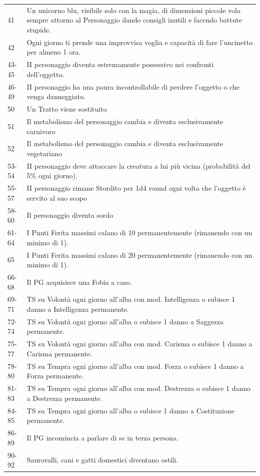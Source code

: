 \begin{tabularx}{0.98\textwidth}{lX}
41& Un unicorno blu, visibile solo con la magia, di dimensioni piccole vola sempre attorno al Personaggio dando consigli inutili e facendo battute stupide.\\
42& Ogni giorno ti prende una improvvisa voglia e capacità di fare l'uncinetto per almeno 1 ora.\\
43-45 & II personaggio diventa estremamente possessivo nei confronti dell'oggetto.\\
46-49 & II personaggio ha una paura incontrollabile di perdere l'oggetto o che venga danneggiato.\\
50& Un Tratto viene sostituito\\
51& Il metabolismo del personaggio cambia e diventa esclusivamente carnivoro\\
52& Il metabolismo del personaggio cambia e diventa esclusivamente vegetariano\\
53-54 & II personaggio deve attaccare la creatura a lui più vicina (probabilità del 5\% ogni giorno).\\
55-57 & II personaggio rimane Stordito per 1d4 round ogni volta che l'oggetto è servito al suo scopo\\
58-60 & Il personaggio diventa sordo\\
61-64 & I Punti Ferita massimi calano di 10 permanentemente (rimanendo con un minimo di 1).\\
65& I Punti Ferita massimi calano di 20 permanentemente (rimanendo con un minimo di 1).\\
66-68 & Il PG acquisisce una Fobia a caso.\\
69-71 & TS su Volontà ogni giorno all'alba con mod. Intelligenza o subisce 1 danno a Intelligenza permanente.\\
72-74 & TS su Volontà ogni giorno all'alba o subisce 1 danno a Saggezza permanente.\\
75-77 & TS su Volontà ogni giorno all'alba con mod. Carisma o subisce 1 danno a Carisma permanente.\\
78-80 & TS su Tempra ogni giorno all'alba con mod. Forza o subisce 1 danno a Forza permanente.\\
81-83 & TS su Tempra ogni giorno all'alba con mod. Destrezza o subisce 1 danno a Destrezza permanente.\\
84-85 & TS su Tempra ogni giorno all'alba o subisce 1 danno a Costituzione permanente.\\
86-89& Il PG incomincia a parlare di se in terza persona.\\
90-92& Saurovalli, cani e gatti domestici diventano ostili.\\

\end{tabularx}
